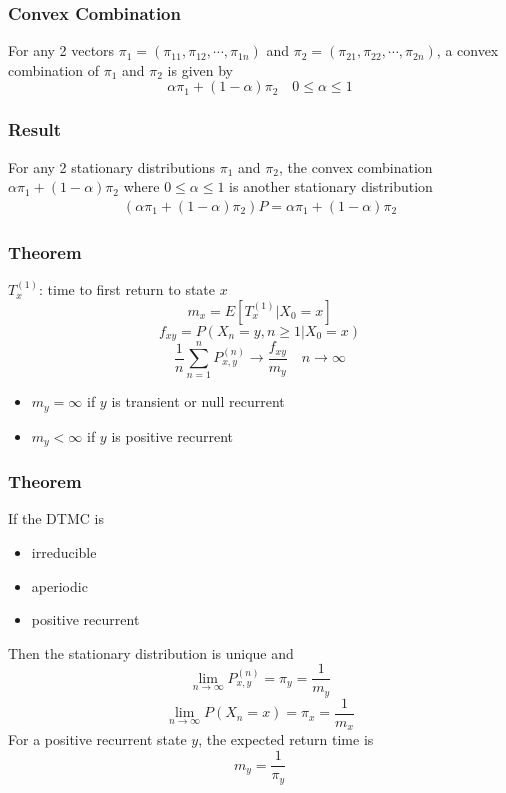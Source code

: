 \documentclass[11pt]{article}
\begin{document}
\subsubsection{Convex Combination}
For any 2 vectors $\pi_1 = (\pi_{11},\pi_{12},\cdots,\pi_{1n})$ and $\pi_2 = (\pi_{21},\pi_{22},\cdots,\pi_{2n})$, a convex combination of $\pi_1$ and $\pi_2$ is given by
\[\alpha\pi_1 + (1-\alpha)\pi_2\quad 0\leq\alpha\leq 1\]
\subsubsection*{Result}
For any 2 stationary distributions $\pi_1$ and $\pi_2$, the convex combination $\alpha\pi_1 + (1-\alpha)\pi_2$ where $0\leq\alpha\leq1$ is another stationary distribution 
\begin{align*}
    (\alpha\pi_1 + (1-\alpha)\pi_2)P = \alpha\pi_1 + (1-\alpha)\pi_2
\end{align*}
\subsubsection*{Theorem}
$T_x^{(1)}$: time to first return to state $x$
\[m_x = E[T_x^{(1)}|X_0=x]\] 
\[f_{xy} = P(X_n = y, n\geq 1|X_0=x)\]   
\[\frac{1}{n}\sum_{n=1}^{n}P_{x,y}^{(n)}\rightarrow \frac{f_{xy}}{m_y}\quad n\to\infty\]   
\begin{itemize}
    \item $m_y = \infty$ if $y$ is transient or null recurrent
    \item $m_y < \infty$ if $y$ is positive recurrent
\end{itemize}
\subsubsection*{Theorem}
If the DTMC is 
\begin{itemize}
    \item irreducible 
    \item aperiodic 
    \item positive recurrent 
\end{itemize}
Then the stationary distribution is unique and 
\[\lim_{n\to\infty}P_{x,y}^{(n)} = \pi_y = \frac{1}{m_y}\]    
\[\lim_{n\to\infty}P(X_n=x) = \pi_x = \frac{1}{m_x}\]    
For a positive recurrent state $y$, the expected return time is 
\[m_y = \frac{1}{\pi_y}\]    
\end{document}

